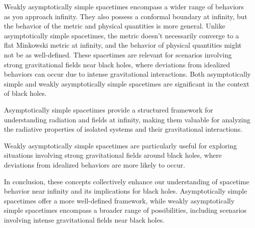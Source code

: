 Weakly asymptotically simple spacetimes encompass a wider range of behaviors as you approach infinity. They also possess a conformal boundary at infinity, but the behavior of the metric and physical quantities is more general. Unlike asymptotically simple spacetimes, the metric doesn't necessarily converge to a flat Minkowski metric at infinity, and the behavior of physical quantities might not be as well-defined. These spacetimes are relevant for scenarios involving strong gravitational fields near black holes, where deviations from idealized behaviors can occur due to intense gravitational interactions.
Both asymptotically simple and weakly asymptotically simple spacetimes are significant in the context of black holes.

Asymptotically simple spacetimes provide a structured framework for understanding radiation and fields at infinity, making them valuable for analyzing the radiative properties of isolated systems and their gravitational interactions.

Weakly asymptotically simple spacetimes are particularly useful for exploring situations involving strong gravitational fields around black holes, where deviations from idealized behaviors are more likely to occur.

In conclusion, these concepts collectively enhance our understanding of spacetime behavior near infinity and its implications for black holes. Asymptotically simple spacetimes offer a more well-defined framework, while weakly asymptotically simple spacetimes encompass a broader range of possibilities, including scenarios involving intense gravitational fields near black holes.

